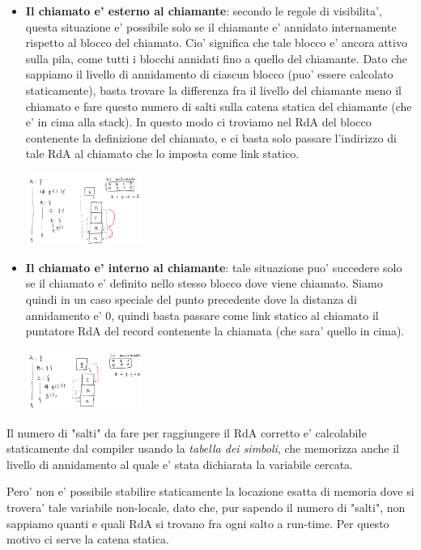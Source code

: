 \begin{itemize}
  \item \textbf{Il chiamato e' esterno al chiamante}: secondo le regole di visibilita', questa situazione e' possibile solo se il chiamante e' annidato internamente rispetto al blocco del chiamato. Cio' significa che tale blocco e' ancora attivo sulla pila, come tutti i blocchi annidati fino a quello del chiamante. Dato che sappiamo il livello di annidamento di ciascun blocco (puo' essere calcolato staticamente), basta trovare la differenza fra il livello del chiamante meno il chiamato e fare questo numero di salti sulla catena statica del chiamante (che e' in cima alla stack). In questo modo ci troviamo nel RdA del blocco contenente la definizione del chiamato, e ci basta solo passare l'indirizzo di tale RdA al chiamato che lo imposta come link statico.
    \begin{center}
      \includegraphics[width=0.3\textwidth]{img/2025-03-06-14-23-08.png}
    \end{center}
  \item \textbf{Il chiamato e' interno al chiamante}: tale situazione puo' succedere solo se il chiamato e' definito nello stesso blocco dove viene chiamato. Siamo quindi in un caso speciale del punto precedente dove la distanza di annidamento e' 0, quindi basta passare come link statico al chiamato il puntatore RdA del record contenente la chiamata (che sara' quello in cima).
    \begin{center}
      \includegraphics[width=0.3\textwidth]{img/2025-03-06-14-26-54.png}
    \end{center}
\end{itemize}

Il numero di "salti" da fare per raggiungere il RdA corretto e' calcolabile staticamente dal compiler usando la \textit{tabella dei simboli}, che memorizza anche il livello di annidamento al quale e' stata dichiarata la variabile cercata. 

Pero' non e' possibile stabilire staticamente la locazione esatta di memoria dove si trovera' tale variabile non-locale, dato che, pur sapendo il numero di "salti", non sappiamo quanti e quali RdA si trovano fra ogni salto a run-time. Per questo motivo ci serve la catena statica.

